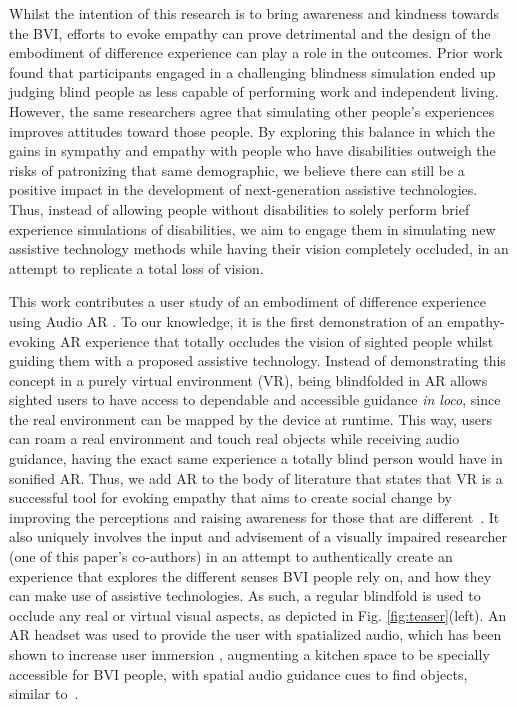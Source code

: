 \documentclass{vgtc}                          %
\begin{document}
Whilst the intention of this research is to bring awareness and kindness towards the BVI, efforts to evoke empathy can prove detrimental and the design of the embodiment of difference experience can play a role in the outcomes. Prior work~\cite{silverman:2015} found that participants engaged in a challenging blindness simulation ended up judging blind people as less capable of performing work and independent living. However, the same researchers agree that simulating other people’s experiences improves attitudes toward those people. By exploring this balance in which the gains in sympathy and empathy with people who have disabilities outweigh the risks of patronizing that same demographic, we believe there can still be a positive impact in the development of next-generation assistive technologies. Thus, instead of allowing people without disabilities to solely perform brief experience simulations of disabilities, we aim to engage them in simulating new assistive technology methods while having their vision completely occluded, in an attempt to replicate a total loss of vision. 


This work contributes a user study of an embodiment of difference experience using Audio AR \cite{yang2022audio}. To our knowledge, it is the first demonstration of an empathy-evoking AR experience that totally occludes the vision of sighted people whilst guiding them with a proposed assistive technology. Instead of demonstrating this concept in a purely virtual environment (VR), being blindfolded in AR allows sighted users to have access to dependable and accessible guidance \textit{in loco}, since the real environment can be mapped by the device at runtime. This way, users can roam a real environment and touch real objects while receiving audio guidance, having the exact same experience a totally blind person would have in sonified AR. Thus, we add AR to the body of literature that states that VR is a successful tool for evoking empathy that aims to create social change by improving the perceptions and raising awareness for those that are different~\cite{empathymachine2020}. It also uniquely involves the input and advisement of a visually impaired researcher (one of this paper's co-authors) in an attempt to authentically create an experience that explores the different senses BVI people rely on, and how they can make use of assistive technologies. As such, a regular blindfold is used to occlude any real or virtual visual aspects, as depicted in Fig. \ref{fig:teaser}(left). An AR headset was used to provide the user with spatialized audio, which has been shown to increase user immersion \cite{potter:2022}, augmenting a kitchen space to be specially accessible for BVI people, with spatial audio guidance cues to find objects, similar to~\cite{Iravantchi:2020, May:2019, guarese:2021}. 
\end{document}
